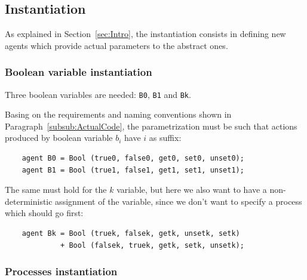\documentclass[10pt,a4paper]{article}
\newcommand{\Agent}[1]{{\tt {#1}}}
\begin{document}
    \subsection{Instantiation}
    \label{subsec:Instantiation}

        As explained in Section~\ref{sec:Intro}, the instantiation
        consists in defining new agents which provide actual parameters to
        the abstract ones.

        \subsubsection{Boolean variable instantiation}

            Three boolean variables are needed: \Agent{B0},
            \Agent{B1} and \Agent{Bk}.

            Basing on the requirements and naming conventions shown in
            Paragraph~\ref{subsub:ActualCode}, the parametrization must be
            such that actions produced by boolean variable $b_i$ have $i$
            as suffix:
            \begin{verbatim}
    agent B0 = Bool (true0, false0, get0, set0, unset0);
    agent B1 = Bool (true1, false1, get1, set1, unset1);
            \end{verbatim}

            The same must hold for the $k$ variable, but here we also want
            to have a non-deterministic assignment of the variable, since
            we don't want to specify a process which should go first:
            \begin{verbatim}
    agent Bk = Bool (truek, falsek, getk, unsetk, setk)
             + Bool (falsek, truek, getk, setk, unsetk);
            \end{verbatim}

        \subsubsection{Processes instantiation}
\end{document}
